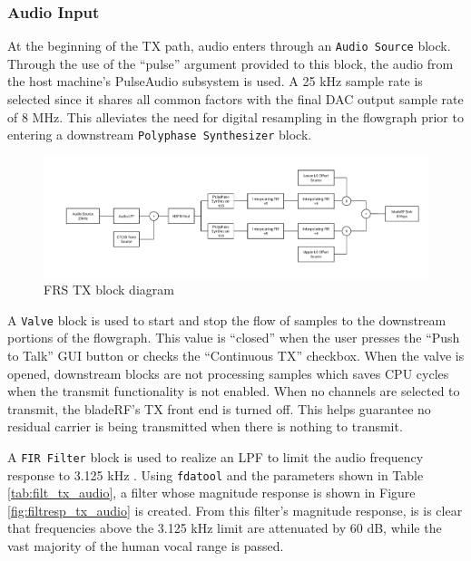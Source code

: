 \subsubsection{Audio Input}
At the beginning of the TX path, audio enters through an \texttt{Audio Source}
block. Through the use of the ``pulse'' argument provided to this block, the
audio from the host machine's PulseAudio \cite{PULSE_AUDIO} subsystem is used.
A 25 kHz sample rate is selected
since it shares all common factors with the final DAC output sample  rate of 8 MHz.
This alleviates the need for digital resampling in the flowgraph prior to entering
a downstream \texttt{Polyphase Synthesizer} block.

\begin{figure}[h]
  \centering
  \includegraphics[width=6.5in]{images/frs/bladeRF_FRS_TX_block_diagram.pdf}
  \caption{FRS TX block diagram}
  \label{fig:frs_tx_block_diagram}
\end{figure}

A \texttt{Valve} block is used to start and stop the flow of samples to the
downstream portions of the flowgraph. This value is ``closed'' when the user
presses the ``Push to Talk'' \ac{GUI} button or checks the ``Continuous \ac{TX}'' checkbox.
When the valve is opened, downstream blocks are not processing samples which
saves CPU cycles when the transmit functionality is not enabled. When no channels
are selected to transmit, the bladeRF's \ac{TX} front end is turned off.  This
helps guarantee no residual carrier is being transmitted when there is nothing
to transmit.

A \texttt{\ac{FIR} Filter} block is used to realize an \ac{LPF} to limit the
audio frequency response to 3.125 kHz \cite{FCC_PART_95B}. Using
\texttt{fdatool} and the parameters shown in Table \ref{tab:filt_tx_audio},
a filter whose magnitude response is shown in Figure \ref{fig:filtresp_tx_audio}
is created.  From this filter's magnitude response, is is clear that
frequencies above the 3.125 kHz limit are attenuated by 60 dB, while the vast
majority of the human vocal range is passed.

